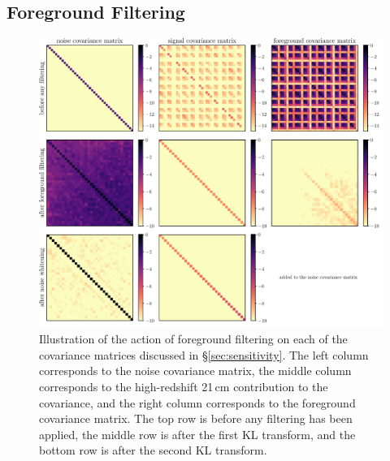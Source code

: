 \begin{bibunit}
\section{Foreground Filtering}\label{sec:foreground-filtering}

\begin{figure}
    \centering
    \includegraphics[width=\textwidth]{figures/chapter4/foreground-filtering-illustration}
    \caption{
        Illustration of the action of foreground filtering on each of the covariance matrices
        discussed in \S\ref{sec:sensitivity}. The left column corresponds to the noise covariance
        matrix, the middle column corresponds to the high-redshift 21\,cm contribution to the
        covariance, and the right column corresponds to the foreground covariance matrix. The top
        row is before any filtering has been applied, the middle row is after the first KL
        transform, and the bottom row is after the second KL transform.
    }
    \label{fig:foreground-filtering-illustration}
\end{figure}


\end{bibunit}
